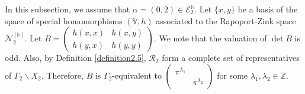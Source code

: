 \documentclass[11pt,oneside]{amsart}
\theoremstyle{plain}
\theoremstyle{definition}
\theoremstyle{remark}
\newcommand{\BV}{{\mathbb V}}
\newcommand{\BZ}{{\mathbb Z}}
\newcommand{\CE}{{\mathcal E}}
\newcommand{\CN}{{\mathcal N}}
\newcommand{\CR}{{\mathcal R}}
\newcommand{\h}{\mathbb{H}}
\numberwithin{equation}{section}
\begin{document}
        
     In this subsection,   we assume that $\alpha=(0,2) \in \CE_{2}^{\mathds{h}}$. Let $\lbrace x ,y \rbrace$ be a basis of the space of special homomorphisms $(\BV,h)$ associated to the Rapoport-Zink space $\CN^{[\mathds{h}]}_2$.	Let $B=\left(\begin{array}{cc} h(x,x)& h(x,y)\\h(y,x)&h(y,y) \end{array}\right).$ We note that the valuation of $\det B$ is odd. Also, by Definition \ref{definition2.5}, $\CR_2$ form a complete set of representatives of $\Gamma_2 \backslash X_2$. Therefore, $B$ is $\Gamma_2$-equivalent to $\left(\begin{array}{cc} \pi^{\lambda_1}& \\&\pi^{\lambda_2} \end{array}\right)$ for some $\lambda_1, \lambda_2 \in \BZ$. 
     
\end{document}
